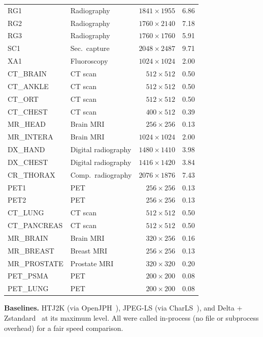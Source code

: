 \documentclass[journal]{IEEEtran}
\begin{document}
\begin{table}[htbp]
\begin{tabular}{llrr}
RG1  & Radiography    & $1841{\times}1955$ & 6.86 \\
RG2  & Radiography    & $1760{\times}2140$ & 7.18 \\
RG3  & Radiography    & $1760{\times}1760$ & 5.91 \\
SC1  & Sec.~capture   & $2048{\times}2487$ & 9.71 \\
XA1  & Fluoroscopy    & $1024{\times}1024$ & 2.00 \\
CT\_BRAIN    & CT scan             & $512{\times}512$   & 0.50 \\
CT\_ANKLE    & CT scan             & $512{\times}512$   & 0.50 \\
CT\_ORT      & CT scan             & $512{\times}512$   & 0.50 \\
CT\_CHEST    & CT scan             & $400{\times}512$   & 0.39 \\
MR\_HEAD     & Brain MRI           & $256{\times}256$   & 0.13 \\
MR\_INTERA   & Brain MRI           & $1024{\times}1024$ & 2.00 \\
DX\_HAND     & Digital radiography & $1480{\times}1410$ & 3.98 \\
DX\_CHEST    & Digital radiography & $1416{\times}1420$ & 3.84 \\
CR\_THORAX   & Comp.\ radiography  & $2076{\times}1876$ & 7.43 \\
PET1         & PET                 & $256{\times}256$   & 0.13 \\
PET2         & PET                 & $256{\times}256$   & 0.13 \\
CT\_LUNG     & CT scan             & $512{\times}512$   & 0.50 \\
CT\_PANCREAS & CT scan             & $512{\times}512$   & 0.50 \\
MR\_BRAIN    & Brain MRI           & $320{\times}256$   & 0.16 \\
MR\_BREAST   & Breast MRI          & $256{\times}256$   & 0.13 \\
MR\_PROSTATE & Prostate MRI        & $320{\times}320$   & 0.20 \\
PET\_PSMA    & PET                 & $200{\times}200$   & 0.08 \\
PET\_LUNG    & PET                 & $200{\times}200$   & 0.08 \\
\bottomrule
\end{tabular}
\end{table}

\textbf{Baselines.} HTJ2K (via OpenJPH~\cite{openjph}), JPEG-LS (via
CharLS~\cite{charls}), and Delta + Zstandard~\cite{rfc8878} at its maximum
level. All were called in-process (no file or subprocess overhead) for a fair
speed comparison.
\end{document}

